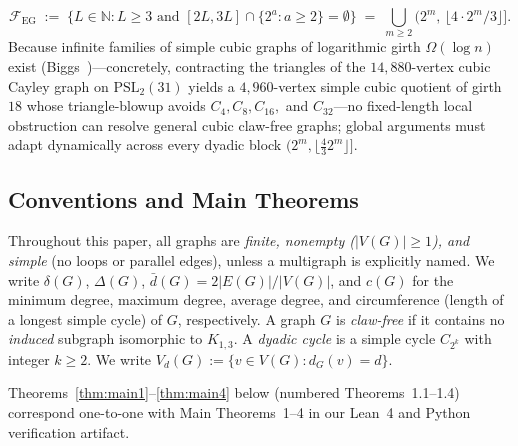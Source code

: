 \documentclass[11pt,reqno]{amsart}
\theoremstyle{plain}
\theoremstyle{definition}
\theoremstyle{remark}
\newcommand{\FEG}{\mathcal{F}_{\mathrm{EG}}}
\DeclareRobustCommand{\_}{\ifmmode\text{\textunderscore}\else\textunderscore\allowbreak\fi}
\begin{document}
\begin{itemize}[leftmargin=1.8em]
  \begin{equation}\label{eq:feg-def}
    \FEG \;:=\; \bigl\{ L \in \mathbb{N} : L \ge 3 \text{ and } [2L, 3L] \cap \{2^a : a \ge 2\} = \emptyset \bigr\}
    \;=\; \bigcup_{m \ge 2} \bigl(2^m,\, \lfloor 4 \cdot 2^m / 3 \rfloor\bigr].
  \end{equation}
  Because infinite families of simple cubic graphs of logarithmic girth $\Omega(\log n)$ exist (Biggs~\cite{Biggs1998})---concretely, contracting the triangles of the $14{,}880$-vertex cubic Cayley graph on $\mathrm{PSL}_2(31)$ yields a $4{,}960$-vertex simple cubic quotient of girth $18$ whose triangle-blowup avoids $C_4, C_8, C_{16},$ and $C_{32}$---no fixed-length local obstruction can resolve general cubic claw-free graphs; global arguments must adapt dynamically across every dyadic block $(2^m, \lfloor \frac{4}{3} 2^m \rfloor]$.
\end{itemize}

\subsection{Conventions and Main Theorems}\label{subsec:conventions-main}

Throughout this paper, all graphs are \emph{finite, nonempty ($|V(G)| \ge 1$), and simple} (no loops or parallel edges), unless a multigraph is explicitly named. We write $\delta(G)$, $\Delta(G)$, $\bar{d}(G) = 2|E(G)|/|V(G)|$, and $c(G)$ for the minimum degree, maximum degree, average degree, and circumference (length of a longest simple cycle) of $G$, respectively. A graph $G$ is \emph{claw-free} if it contains no \emph{induced} subgraph isomorphic to $K_{1,3}$. A \emph{dyadic cycle} is a simple cycle $C_{2^k}$ with integer $k \ge 2$. We write $V_d(G) := \{v \in V(G) : d_G(v) = d\}$.

Theorems~\ref{thm:main1}--\ref{thm:main4} below (numbered Theorems~1.1--1.4) correspond one-to-one with Main Theorems~1--4 in our Lean~4 and Python verification artifact.
\end{document}
